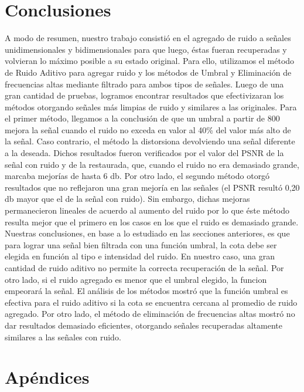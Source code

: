 \documentclass[10pt, a4paper]{article}
\begin{document}
\begin{itemize}
\section{Conclusiones}
A modo de resumen, nuestro trabajo consistió en el agregado de ruido a señales unidimensionales y bidimensionales para que luego, éstas fueran recuperadas y volvieran lo máximo posible a su estado original. Para ello, utilizamos el método de Ruido Aditivo para agregar ruido y los métodos de Umbral y Eliminación de frecuencias altas mediante filtrado para ambos tipos de señales. Luego de una gran cantidad de pruebas, logramos encontrar resultados que efectivizaran los métodos otorgando señales más limpias de ruido y similares a las originales. Para el primer método, llegamos a la conclusión de que un umbral a partir de 800 mejora la señal cuando el ruido no exceda en valor al 40\% del valor más alto de la señal. Caso contrario, el método la distorsiona devolviendo una señal diferente a la deseada. Dichos resultados fueron verificados por el valor del PSNR de la señal con ruido y de la restaurada, que, cuando el ruido no era demasiado grande, marcaba mejorías de hasta 6 db.\newline
\newline
Por otro lado, el segundo método otorgó resultados que no reflejaron una gran mejoría en las señales (el PSNR resultó 0,20 db mayor que el de la señal con ruido). Sin embargo, dichas mejoras permanecieron lineales de acuerdo al aumento del ruido por lo que éste método resulta mejor que el primero en los casos en los que el ruido es demasiado grande.\newline
\newline
Nuestras conclusiones, en base a lo estudiado en las secciones anteriores, es que para lograr una señal bien filtrada con una función umbral, la cota debe ser elegida en función al tipo e intensidad del ruido. En nuestro caso, una gran cantidad de ruido aditivo no permite la correcta recuperación de la señal. Por otro lado, si el ruido agregado es menor que el umbral elegido, la funcion empeorará la señal. El análisis de los métodos mostró que la función umbral es efectiva para el ruido aditivo si la cota se encuentra cercana al promedio de ruido agregado. Por otro lado, el método de eliminación de frecuencias altas mostró no dar resultados demasiado eficientes, otorgando señales recuperadas altamente similares a las señales con ruido.

\section{Ap\'endices}

\end{itemize}
\end{document}
